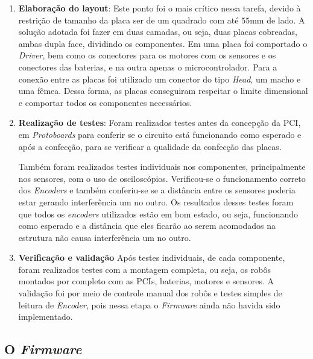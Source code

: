 \begin{enumerate}
    \item \textbf{Elaboração do layout}:
        Este ponto foi o mais crítico nessa tarefa, devido à restrição de tamanho da placa ser de um quadrado com até $55$mm de lado. A solução adotada foi fazer em duas camadas, ou seja, duas placas cobreadas, ambas dupla face, dividindo os componentes. Em uma placa foi comportado o \textit{Driver}, bem como os conectores para os motores com os sensores e os conectores das baterias, e na outra apenas o microcontrolador. Para a conexão entre as placas foi utilizado um conector do tipo \textit{Head}, um macho e uma fêmea. Dessa forma, as placas conseguiram respeitar o limite dimensional e comportar todos os componentes necessários.
    \item \textbf{Realização de testes}:
        Foram realizados testes antes da concepção da PCI, em \textit{Protoboards} para conferir se o circuito está funcionando como esperado e após a confecção, para se verificar a qualidade da confecção das placas.
        
        Também foram realizados testes individuais nos componentes, principalmente nos sensores, com o uso de osciloscópios. Verificou-se o funcionamento correto dos \textit{Encoders} e também conferiu-se se a distância entre os sensores poderia estar gerando interferência um no outro. Os resultados desses testes foram que todos os \textit{encoders} utilizados estão em bom estado, ou seja, funcionando como esperado e a distância que eles ficarão ao serem acomodados na estrutura não causa interferência um no outro.
    \item \textbf{Verificação e validação}
        Após testes individuais, de cada componente, foram realizados testes com a montagem completa, ou seja, os robôs montados por completo com as PCIs, baterias, motores e sensores. A validação foi por meio de controle manual dos robôs e testes simples de leitura de \textit{Encoder}, pois nessa etapa o \textit{Firmware} ainda não havida sido implementado.
\end{enumerate}

\subsection{O \emph{Firmware}}

